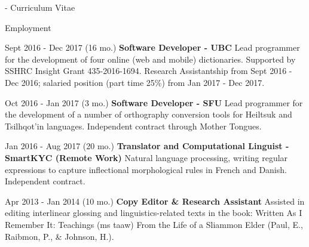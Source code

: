 \documentclass[12pt]{letter}
\begin{document}
\begin{cv}{     \space - \space   Curriculum Vitae}
\begin{cvlist}{Employment}
                    \item[Sept 2016 - Dec 2017 (16 mo.)] \textbf{Software Developer - UBC}
            \newline Lead programmer for the development of four online (web and mobile) dictionaries. Supported by SSHRC Insight Grant 435-2016-1694. Research Assistantship from Sept 2016 - Dec 2016; salaried position (part time 25\%) from Jan 2017 - Dec 2017.
            
            \item[Oct 2016 - Jan 2017 (3 mo.)] \textbf{Software Developer - SFU}
            \newline Lead programmer for the development of a number of orthography conversion tools for Heiltsuk and Tsilhqot'in languages. Independent contract through Mother Tongues.
            
            \item[Jan 2016 - Aug 2017 (20 mo.)] \textbf{Translator and Computational Linguist - SmartKYC (Remote Work) }
            \newline Natural language processing, writing regular expressions to capture inflectional morphological rules in French and Danish. Independent contract.
            
            
            \item[Apr 2013 - Jan 2014 (10 mo.)]	\textbf{Copy Editor \& Research Assistant}
            \newline Assisted in editing interlinear glossing and linguistics-related texts in the book: Written As I Remember It: Teachings (\textglotstop \textschwa ms ta\textglotstop aw) From the Life of a Sliammon Elder (Paul, E., Raibmon, P., \& Johnson, H.).
            
            

\end{cvlist}
\end{cv}
\end{document}
